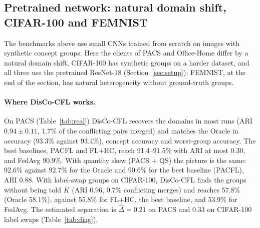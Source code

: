 \subsection{Pretrained network: natural domain shift, CIFAR-100 and FEMNIST}\label{sec:real}
The benchmarks above use small CNNs trained from scratch on images with synthetic concept groups. Here the clients of PACS and Office-Home differ by a natural domain shift, CIFAR-100 has synthetic groups on a harder dataset, and all three use the pretrained ResNet-18 (Section~\ref{sec:setup}); FEMNIST, at the end of the section, has natural heterogeneity without ground-truth groups.

\begin{table}[!htbp]
\centering
\caption{PACS, PACS with quantity skew, Office-Home and CIFAR-100 (40 clients, 5 seeds; DisCo-T30: 3 seeds). Columns as in Table~\ref{tab:main}; IFCA, FeSEM, FL+HC, PACFL and FedDAG-C receive the true $K=4$. The last block repeats FEMNIST (Table~\ref{tab:real_femnist}); there ARI is computed against a single group and is not meaningful.}\label{tab:real}

\end{table}

\begin{table}[!htbp]
\centering
\caption*{Table~\ref{tab:real} (continued).}

\end{table}

\paragraph{Where DisCo-CFL works.} On PACS (Table~\ref{tab:real}) DisCo-CFL recovers the domains in most runs (ARI $0.94\pm0.11$, 1.7\% of the conflicting pairs merged) and matches the Oracle in accuracy (93.3\% against 93.4\%), concept accuracy and worst-group accuracy. The best baselines, PACFL and FL+HC, reach 91.4--91.5\% with ARI at most $0.30$, and FedAvg 90.9\%. With quantity skew (PACS + QS) the picture is the same: 92.6\% against 92.7\% for the Oracle and 90.6\% for the best baseline (PACFL), ARI $0.88$. With label-swap groups on CIFAR-100, DisCo-CFL finds the groups without being told $K$ (ARI $0.96$, 0.7\% conflicting merges) and reaches 57.8\% (Oracle 58.1\%), against 55.8\% for FL+HC, the best baseline, and 53.9\% for FedAvg. The estimated separation is $\hat\Delta=0.21$ on PACS and $0.33$ on CIFAR-100 label swaps (Table~\ref{tab:diag}).

